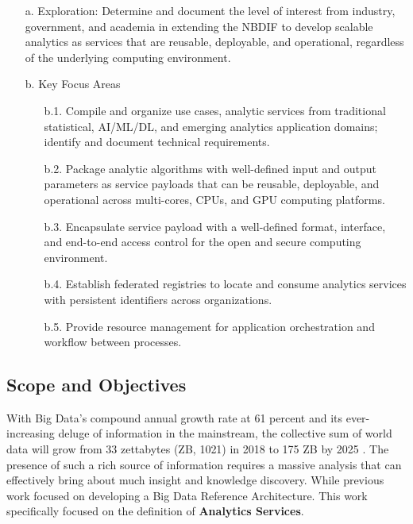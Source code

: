 \begin{enumerate}
  
\item[a.] Exploration: Determine and document the level of interest
  from industry, government, and academia in extending the NBDIF to
  develop scalable analytics as services that are reusable,
  deployable, and operational, regardless of the underlying computing
  environment.

\item[b.] Key Focus Areas

  \begin{enumerate}

  \item[b.1.] Compile and organize use cases, analytic services from
    traditional statistical, AI/ML/DL, and emerging analytics
    application domains; identify and document technical requirements.

   \item[b.2.] Package analytic algorithms with well-defined input and
     output parameters as service payloads that can be reusable,
     deployable, and operational across multi-cores, CPUs, and GPU
     computing platforms.

   \item[b.3.] Encapsulate service payload with a well-defined format,
     interface, and end-to-end access control for the open and secure
     computing environment.

   \item[b.4.] Establish federated registries to locate and consume
     analytics services with persistent identifiers across
     organizations.

   \item[b.5.] Provide resource management for application
     orchestration and workflow between processes.

  \end{enumerate}
  
\end{enumerate}




\subsection{Scope and Objectives}

With Big Data’s compound annual growth rate at 61 percent and its
ever-increasing deluge of information in the mainstream, the
collective sum of world data will grow from 33 zettabytes (ZB, 1021)
in 2018 to 175 ZB by 2025 . The presence of such a rich source of
information requires a massive analysis that can effectively bring
about much insight and knowledge discovery. While previous work
focused on developing a Big Data Reference Architecture. This work
specifically focused on the definition of {\bf Analytics Services}.

